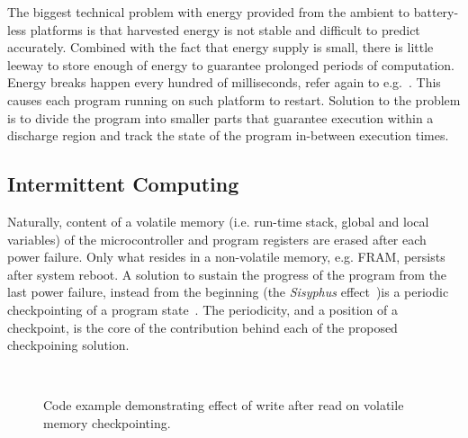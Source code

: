 The biggest technical problem with energy provided from the ambient to battery-less platforms is that harvested energy is not stable and difficult to predict accurately. Combined with the fact that energy supply is small, there is little leeway to store enough of energy to guarantee prolonged periods of computation. Energy breaks happen every hundred of milliseconds, refer again to e.g.~\cite[Fig. 1]{mementos}. This causes each program running on such platform to restart. Solution to the problem is to divide the program into smaller parts that guarantee execution within a discharge region and track the state of the program in-between execution times.

\subsection{Intermittent Computing}
\label{sec:background_consistency}

Naturally, content of a volatile memory (i.e. run-time stack, global and local variables) of the microcontroller and program registers are erased after each power failure. Only what resides in a non-volatile memory, e.g. FRAM, persists after system reboot. A solution to sustain the progress of the program from the last power failure, instead from the beginning (the \emph{Sisyphus} effect~\cite[Sec. 2]{mementos})is a periodic checkpointing of a program state~\cite{mementos,hibernusplusplus,quickrecall,idetic}. The periodicity, and a position of a checkpoint, is the core of the contribution behind each of the proposed checkpoining solution. 

\begin{figure}
	\centering
	\\
	\caption{Code example demonstrating effect of write after read on volatile memory checkpointing.}
	\label{fig:code_demo_incosistency}
\end{figure}

